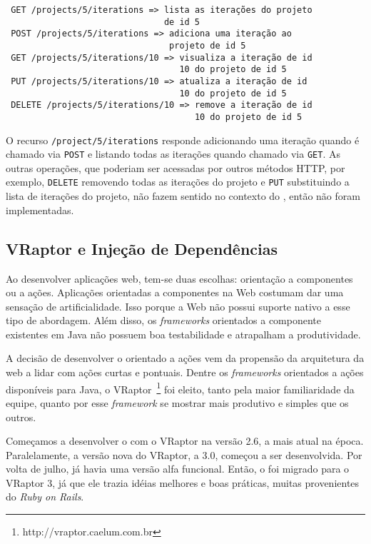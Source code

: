 \begin{verbatim}
 GET /projects/5/iterations => lista as iterações do projeto 
                               de id 5
 POST /projects/5/iterations => adiciona uma iteração ao 
                                projeto de id 5
 GET /projects/5/iterations/10 => visualiza a iteração de id 
                                  10 do projeto de id 5
 PUT /projects/5/iterations/10 => atualiza a iteração de id 
                                  10 do projeto de id 5
 DELETE /projects/5/iterations/10 => remove a iteração de id 
                                     10 do projeto de id 5
\end{verbatim}

O recurso \texttt{/project/5/iterations} responde adicionando uma iteração quando é chamado via \texttt{POST} e listando todas as iterações quando chamado via \texttt{GET}. As outras operações, que poderiam ser acessadas por outros métodos HTTP, por exemplo, \texttt{DELETE} removendo todas as iterações do projeto e \texttt{PUT} substituindo a lista de iterações do projeto, não fazem sentido no contexto do \calopsita{}, então não foram implementadas.

\subsection{VRaptor e Injeção de Dependências}

Ao desenvolver aplicações web, tem-se duas escolhas: orientação a componentes ou a ações. Aplicações orientadas a componentes na Web costumam dar uma sensação de artificialidade. Isso porque a Web não possui suporte nativo a esse tipo de abordagem. Além disso, os \textit{frameworks} orientados a componente existentes em Java não possuem boa testabilidade e atrapalham a produtividade. 

A decisão de desenvolver o \calopsita{} orientado a ações vem da propensão da arquitetura da web a lidar com ações curtas e pontuais. Dentre os \textit{frameworks} orientados a ações disponíveis para Java, o VRaptor~\footnote{http://vraptor.caelum.com.br} foi eleito, tanto pela maior familiaridade da equipe, quanto por esse \textit{framework} se mostrar mais produtivo e simples que os outros.

Começamos a desenvolver o \calopsita{} com o VRaptor na versão 2.6, a mais atual na época. Paralelamente, a versão nova do VRaptor, a 3.0, começou a ser desenvolvida. Por volta de julho, já havia uma versão alfa funcional. Então, o \calopsita{} foi migrado para o VRaptor 3, já que ele trazia idéias melhores e boas práticas, muitas provenientes do \textit{Ruby on Rails}. 

